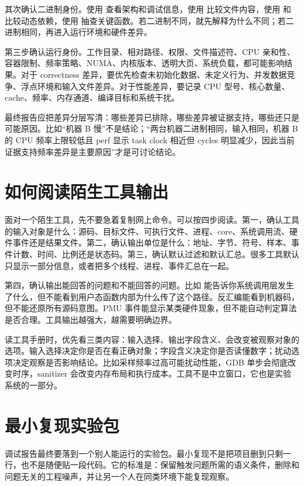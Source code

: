 其次确认二进制身份。使用  查看架构和调试信息，使用  比较文件内容，使用  和  比较动态依赖，使用  抽查关键函数。若二进制不同，就先解释为什么不同；若二进制相同，再进入运行环境和硬件差异。

第三步确认运行身份。工作目录、相对路径、权限、文件描述符、CPU 亲和性、容器限制、频率策略、NUMA、内核版本、透明大页、系统负载，都可能影响结果。对于 correctness 差异，要优先检查未初始化数据、未定义行为、并发数据竞争、浮点环境和输入文件差异。对于性能差异，要记录 CPU 型号、核心数量、cache、频率、内存通道、编译目标和系统干扰。

最终报告应把差异分层写清：哪些差异已排除，哪些差异被证据支持，哪些还只是可能原因。比如“机器 B 慢”不是结论；“两台机器二进制相同，输入相同，机器 B 的 CPU 频率上限较低且 perf 显示 task clock 相近但 cycles 明显减少，因此当前证据支持频率差异是主要原因”才是可讨论结论。

\section{如何阅读陌生工具输出}

面对一个陌生工具，先不要急着复制网上命令。可以按四步阅读。第一，确认工具的输入对象是什么：源码、目标文件、可执行文件、进程、core、系统调用流、硬件事件还是结果文件。第二，确认输出单位是什么：地址、字节、符号、样本、事件计数、时间、比例还是状态码。第三，确认默认过滤和默认汇总。很多工具默认只显示一部分信息，或者把多个线程、进程、事件汇总在一起。

第四，确认输出能回答的问题和不能回答的问题。比如  能告诉你系统调用层发生了什么，但不能看到用户态函数内部为什么传了这个路径。反汇编能看到机器码，但不能还原所有源码意图。PMU 事件能显示某类硬件现象，但不能自动判定算法是否合理。工具输出越强大，越需要明确边界。

读工具手册时，优先看三类内容：输入选择、输出字段含义、会改变被观察对象的选项。输入选择决定你是否在看正确对象；字段含义决定你是否读懂数字；扰动选项决定观察是否影响结论。比如采样频率过高可能扰动性能，GDB 单步会彻底改变时序，sanitizer 会改变内存布局和执行成本。工具不是中立窗口，它也是实验系统的一部分。

\section{最小复现实验包}

调试报告最终要落到一个别人能运行的实验包。最小复现不是把项目删到只剩一行，也不是随便贴一段代码。它的标准是：保留触发问题所需的语义条件，删除和问题无关的工程噪声，并让另一个人在同类环境下能复现观察。

